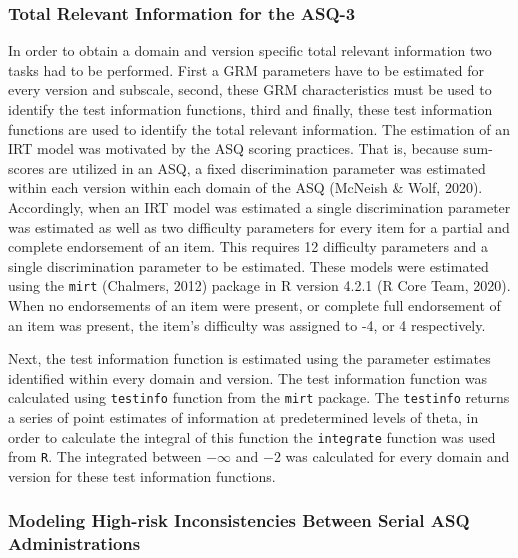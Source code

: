 \documentclass[
  11pt,
]{article}
\begin{document}
\hypertarget{total-relevant-information-for-the-asq-3}{%
\subsubsection{Total Relevant Information for the
ASQ-3}\label{total-relevant-information-for-the-asq-3}}

In order to obtain a domain and version specific total relevant
information two tasks had to be performed. First a GRM parameters have
to be estimated for every version and subscale, second, these GRM
characteristics must be used to identify the test information functions,
third and finally, these test information functions are used to identify
the total relevant information. The estimation of an IRT model was
motivated by the ASQ scoring practices. That is, because sum-scores are
utilized in an ASQ, a fixed discrimination parameter was estimated
within each version within each domain of the ASQ (McNeish \& Wolf,
2020). Accordingly, when an IRT model was estimated a single
discrimination parameter was estimated as well as two difficulty
parameters for every item for a partial and complete endorsement of an
item. This requires 12 difficulty parameters and a single discrimination
parameter to be estimated. These models were estimated using the
\texttt{mirt} (Chalmers, 2012) package in R version 4.2.1 (R Core Team,
2020). When no endorsements of an item were present, or complete full
endorsement of an item was present, the item's difficulty was assigned
to -4, or 4 respectively.

Next, the test information function is estimated using the parameter
estimates identified within every domain and version. The test
information function was calculated using \texttt{testinfo} function
from the \texttt{mirt} package. The \texttt{testinfo} returns a series
of point estimates of information at predetermined levels of theta, in
order to calculate the integral of this function the \texttt{integrate}
function was used from \texttt{R}. The integrated between \(-\infty\)
and \(-2\) was calculated for every domain and version for these test
information functions.

\hypertarget{modeling-high-risk-inconsistencies-between-serial-asq-administrations}{%
\subsubsection{Modeling High-risk Inconsistencies Between Serial ASQ
Administrations}\label{modeling-high-risk-inconsistencies-between-serial-asq-administrations}}
\end{document}
